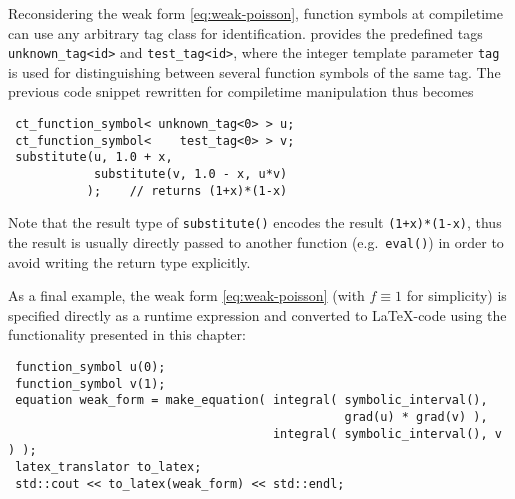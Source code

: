 Reconsidering the weak form \eqref{eq:weak-poisson}, function symbols at compiletime can use any arbitrary tag class for identification.
{\ViennaMath} provides the predefined tags \lstinline|unknown_tag<id>| and \lstinline|test_tag<id>|, where the integer template parameter \lstinline|tag| is used for distinguishing between several function symbols of the same tag. The previous code snippet rewritten for compiletime manipulation thus becomes
\begin{lstlisting}
 ct_function_symbol< unknown_tag<0> > u;
 ct_function_symbol<    test_tag<0> > v;
 substitute(u, 1.0 + x,
            substitute(v, 1.0 - x, u*v)
           );    // returns (1+x)*(1-x)
\end{lstlisting}
Note that the result type of \lstinline|substitute()| encodes the result \lstinline|(1+x)*(1-x)|, thus the result is usually directly passed to another function (e.g.~\lstinline|eval()|) in order to avoid writing the return type explicitly.

As a final example, the weak form \eqref{eq:weak-poisson} (with $f \equiv 1$ for simplicity) is specified directly as a {\ViennaMath} runtime expression and converted to {\LaTeX}-code using the functionality presented in this chapter:
\begin{lstlisting}
 function_symbol u(0);
 function_symbol v(1);
 equation weak_form = make_equation( integral( symbolic_interval(),
                                               grad(u) * grad(v) ),
                                     integral( symbolic_interval(), v ) );
 latex_translator to_latex;
 std::cout << to_latex(weak_form) << std::endl;
\end{lstlisting}





